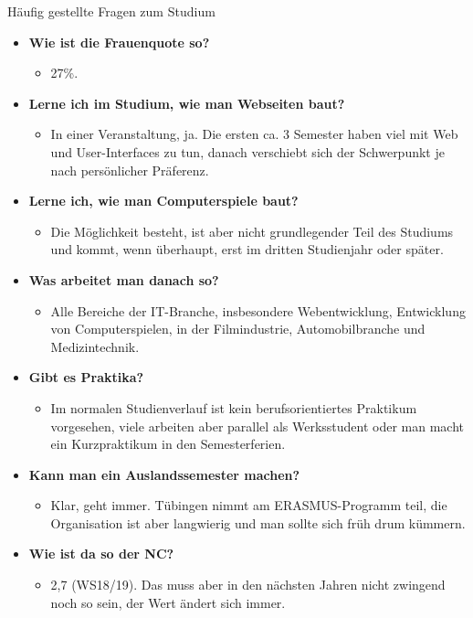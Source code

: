 \begin{block}{Häufig gestellte Fragen zum Studium}
\begin{large}
\begin{itemize}
\item \textbf{Wie ist die Frauenquote so?}
\begin{itemize}
	\item 27\%.
\end{itemize}

\item \textbf{Lerne ich im Studium, wie man Webseiten baut?}
\begin{itemize}
	\item In einer Veranstaltung, ja. Die ersten ca. 3 Semester haben viel mit Web und User-Interfaces zu tun, danach verschiebt sich der Schwerpunkt je nach persönlicher Präferenz.
\end{itemize}

\item \textbf{Lerne ich, wie man Computerspiele baut?}
\begin{itemize}
	\item Die Möglichkeit besteht, ist aber nicht grundlegender Teil des Studiums und kommt, wenn überhaupt, erst im dritten Studienjahr oder später.
\end{itemize}

\item \textbf{Was arbeitet man danach so?}
\begin{itemize}
	\item Alle Bereiche der IT-Branche, insbesondere Webentwicklung, Entwicklung von Computerspielen, in der Filmindustrie, Automobilbranche und Medizintechnik.
\end{itemize}

\item \textbf{Gibt es Praktika?}
\begin{itemize}
	\item Im normalen Studienverlauf ist kein berufsorientiertes Praktikum vorgesehen, viele arbeiten aber parallel als Werksstudent oder man macht ein Kurzpraktikum in den Semesterferien.
\end{itemize}

\item \textbf{Kann man ein Auslandssemester machen?}
\begin{itemize}
	\item Klar, geht immer. Tübingen nimmt am ERASMUS-Programm teil, die Organisation ist aber langwierig und man sollte sich früh drum kümmern.
\end{itemize}

\item \textbf{Wie ist da so der NC?}
\begin{itemize}
	\item 2,7 (WS18/19). Das muss aber in den nächsten Jahren nicht zwingend noch so sein, der Wert ändert sich immer.
\end{itemize}

\end{itemize}

\end{large}
\end{block}
